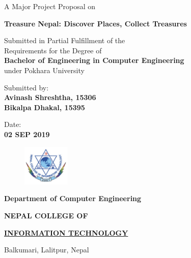 \documentclass[12pt, a4paper]{report}
\begin{document}
\begin{titlepage}
	\begin{center}
	
	\large%
	A Major Project Proposal on
	
	\huge %
	\textbf{Treasure Nepal: Discover Places, Collect Treasures}

	\vfill
	
	\large %
	Submitted in Partial Fulfillment of the \\ 
	Requirements for the Degree of \\ 
	\textbf {Bachelor of Engineering in Computer Engineering} \\
	under Pokhara University
	
	\vfill
	
	Submitted by: \\ 
	\textbf {Avinash Shreshtha, 15306} \\
	\textbf {Bikalpa Dhakal, 15395} \\
	
	\vfill
	
	
	
	Date: \\
	\textbf {02 SEP 2019}
	
	\vfill
	
	\end{center}
	
	\begin{figure}
	\centering
	\includegraphics[width=0.2\textwidth]{college-logo}
	\end{figure}
	
	\selectfont
	
	\textbf {Department of Computer Engineering}  
	
	\Large %
	\textbf {NEPAL COLLEGE OF} 
	
	\LARGE %
	\textbf {\underline {INFORMATION TECHNOLOGY} }
	
	\small %
	Balkumari, Lalitpur, Nepal
	
	
\end{titlepage}
\end{document}
